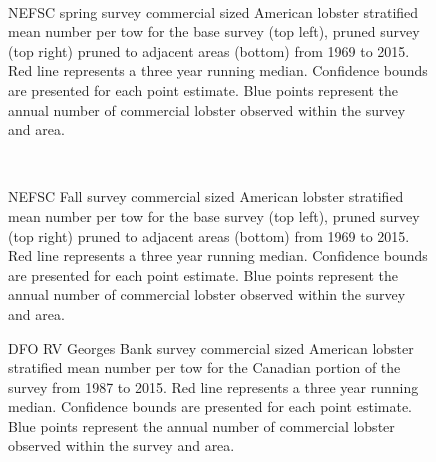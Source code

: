 \documentclass[11pt]{article}
\newcommand{\e}{/backup/bio_data/bio.lobster/figures/} %
\begin{document}
\begin{figure}
\centering
{}\\
\caption{NEFSC spring survey commercial sized American lobster stratified mean number per tow for the base survey (top left), pruned survey (top right) pruned to adjacent areas (bottom) from 1969 to 2015. Red line represents a three year running median. Confidence bounds are presented for each point estimate. Blue points represent the annual number of commercial lobster observed within the survey and area.}
\end{figure}
\clearpage


\begin{figure}
\centering
{}\\
\caption{NEFSC Fall survey commercial sized American lobster stratified mean number per tow for the base survey (top left), pruned survey (top right) pruned to adjacent areas (bottom) from 1969 to 2015. Red line represents a three year running median. Confidence bounds are presented for each point estimate. Blue points represent the annual number of commercial lobster observed within the survey and area.}
\end{figure}
\clearpage

\begin{figure}

    \caption{DFO RV Georges Bank survey commercial sized American lobster stratified mean number per tow for the Canadian portion of the survey from 1987 to 2015. Red line represents a three year running median. Confidence bounds are presented for each point estimate. Blue points represent the annual number of commercial lobster observed within the survey and area.}

\end{figure}
\end{document}
